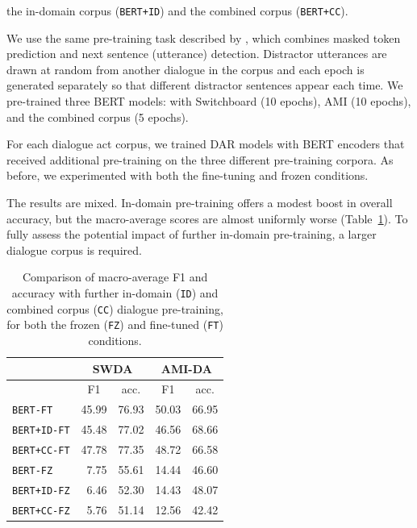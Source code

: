 \documentclass[11pt,a4paper]{article}
\begin{document}
the in-domain corpus (\texttt{BERT+ID}) and the combined corpus (\texttt{BERT+CC}).

We use the same pre-training task described by \citet{devlinBERTPretrainingDeep2018}, which combines masked token prediction and next sentence (utterance) detection. 
Distractor utterances are drawn at random from another dialogue in the corpus
and each epoch is generated separately so that different distractor sentences appear each time.
We pre-trained three BERT models: with Switchboard (10 epochs), AMI (10 epochs), and the combined corpus (5 epochs).

For each dialogue act corpus, we trained DAR models with BERT encoders that received additional pre-training on the three different pre-training corpora. 
As before, we experimented with both the fine-tuning and frozen conditions.

The results are mixed.
In-domain pre-training offers a modest boost in overall accuracy,
but the macro-average scores are almost uniformly worse (Table~\ref{table:exp3}).
To fully assess the potential impact of further in-domain pre-training, a larger dialogue corpus is required.

\begin{table}[]
\begin{tabular}{@{}lrrrr@{}}
\toprule
           & \multicolumn{2}{c}{SWDA}                          & \multicolumn{2}{c}{AMI-DA}                        \\ \midrule
           & \multicolumn{1}{c}{F1} & \multicolumn{1}{c}{acc.} & \multicolumn{1}{c}{F1} & \multicolumn{1}{c}{acc.} \\
\texttt{BERT-FT}    & 45.99                  & 76.93                    & 50.03                  & 66.95                    \\
\texttt{BERT+ID-FT} & 45.48                  & 77.02                    & 46.56                  & 68.66                    \\
\texttt{BERT+CC-FT} & 47.78                  & 77.35                    & 48.72                  & 66.58                    \\ \midrule
\texttt{BERT-FZ}    & 7.75                   & 55.61                    & 14.44                  & 46.60                    \\
\texttt{BERT+ID-FZ} & 6.46                   & 52.30                    & 14.43                  & 48.07                    \\
\texttt{BERT+CC-FZ} & 5.76                   & 51.14                    & 12.56                  & 42.42                    \\ \bottomrule
\end{tabular}
  \caption{Comparison of macro-average F1 and accuracy  with further in-domain (\texttt{ID}) and combined corpus (\texttt{CC}) dialogue pre-training,
    for both the frozen (\texttt{FZ}) and fine-tuned (\texttt{FT}) conditions.}
  \label{table:exp3}
\end{table}
\end{document}
